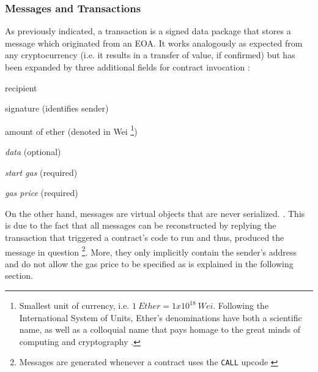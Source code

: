 \subsubsection{Messages and Transactions}
As previously indicated, a transaction is a signed data package that stores a message which originated from an \ac{EOA}. It works analogously as expected from any cryptocurrency (i.e. it results in a transfer of value, if confirmed) but has been expanded by three additional fields for contract invocation \cite[p.~18]{ethereumWhitepaperGitHub}: 

\begin{AutoMultiColItemize}
  \item recipient
  \item signature (identifies sender)
  \item amount of ether (denoted in Wei \footnote{Smallest unit of currency, i.e. $1\ Ether = 1x10^{18}\ Wei$. Following the International System of Units, Ether's denominations have both a scientific name, as well as a colloquial name that pays homage to the great minds of computing and cryptography \cite[p.~40]{Antonopoulos.2018}.})
  \item \textit{data} (optional)
  \item \textit{start gas} (required)
  \item \textit{gas price} (required)
\end{AutoMultiColItemize}

On the other hand, messages are virtual objects that are never serialized. \cite[p.~19]{ethereumWhitepaperGitHub}. This is due to the fact that all messages can be reconstructed by replying the transaction that triggered a contract's code to run and thus, produced the message in question \footnote{Messages are generated whenever a contract uses the \texttt{CALL} upcode \cite[p.~19]{ethereumWhitepaperGitHub}}. More, they only implicitly contain the sender's address and do not allow the gas price to be specified as is explained in the following section.




%
